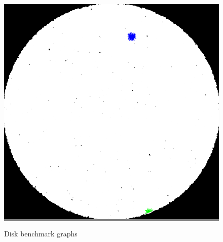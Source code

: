 \documentclass{article}
\begin{document}
\begin{figure}
\begin{minipage}{0.45\textwidth}
    \end{minipage}
    \vskip 0.25in
    \begin{minipage}{0.45\textwidth}
    \colorbox{gray}{\includegraphics[width=\linewidth]{./images/disk_2.png}}
    \end{minipage}

    \caption{Disk benchmark graphs}
    \label{disks}
\end{figure}

\end{document}
